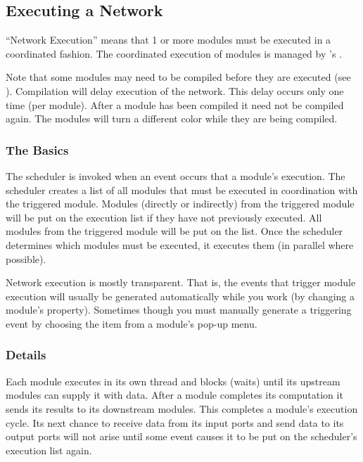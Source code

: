 \subsection{Executing a Network}
\label{sec:executenet}

``Network Execution'' means that 1 or more modules must be executed in a
coordinated fashion. The coordinated execution of modules is managed by
\sr{}'s .

Note that some modules may need to be compiled before they are
executed (see ).  Compilation
will delay execution of the network.  This delay occurs only one time
(per module).  After a module has been compiled it need not be
compiled again.  The modules will turn a different color while they
are being compiled.


\subsubsection{The Basics}

The scheduler is invoked when an event occurs that  a
module's execution.  The scheduler creates a list of all modules that
must be executed in coordination with the triggered module. Modules
 (directly or indirectly) from the triggered module will
be put on the execution list if they have not previously executed.
All modules  from the triggered module will be put
on the list.  Once the scheduler determines which modules must be
executed, it executes them (in parallel where possible).

Network execution is mostly transparent.  That is, the events that trigger
module execution will usually be generated automatically while you work
(\eg by changing a module's property).  Sometimes though you must manually
generate a triggering event by choosing the  item from a
module's pop-up menu.

\subsubsection{Details}

Each module executes in its own thread and blocks (waits) until its upstream
modules can supply it with data.  After a module completes its computation
it sends its results to its downstream modules.  This completes a module's
execution cycle.  Its next chance to receive data from its input ports
and send data to its output ports will not arise until some event
causes it to be put on the scheduler's execution list again.  

